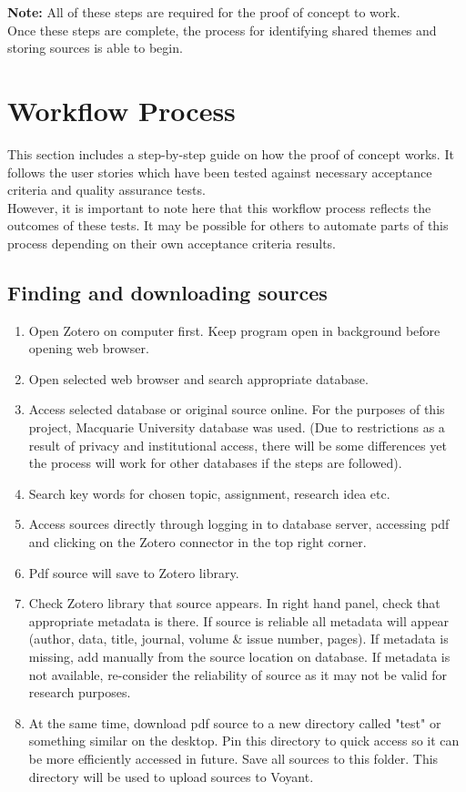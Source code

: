 \documentclass{article}
\begin{document}
\textbf{Note:} All of these steps are required for the proof of concept to work.\\
Once these steps are complete, the process for identifying shared themes and storing sources is able to begin. 

\section{Workflow Process}
This section includes a step-by-step guide on how the proof of concept works. It follows the user stories which have been tested against necessary acceptance criteria and quality assurance tests.\\
However, it is important to note here that this workflow process reflects the outcomes of these tests. It may be possible for others to automate parts of this process depending on their own acceptance criteria results.
\subsection{Finding and downloading sources}
\begin{enumerate}
\item Open Zotero on computer first. Keep program open in background before opening web browser.
\item Open selected web browser and search appropriate database.
    \item Access selected database or original source online. For the purposes of this project, Macquarie University database was used. (Due to restrictions as a result of privacy and institutional access, there will be some differences yet the process will work for other databases if the steps are followed).
    \item Search key words for chosen topic, assignment, research idea etc.
    \item Access sources directly through logging in to database server, accessing pdf and clicking on the Zotero connector in the top right corner.
    \item Pdf source will save to Zotero library.
     \item Check Zotero library that source appears. In right hand panel, check that appropriate metadata is there. If source is reliable all metadata will appear (author, data, title, journal, volume & issue number, pages). If metadata is missing, add manually from the source location on database. If metadata is not available, re-consider the reliability of source as it may not be valid for research purposes.
    \item At the same time, download pdf source to a new directory called "test" or something similar on the desktop. Pin this directory to quick access so it can be more efficiently accessed in future. Save all sources to this folder. This directory will be used to upload sources to Voyant. 
  \end{enumerate}
\end{document}

